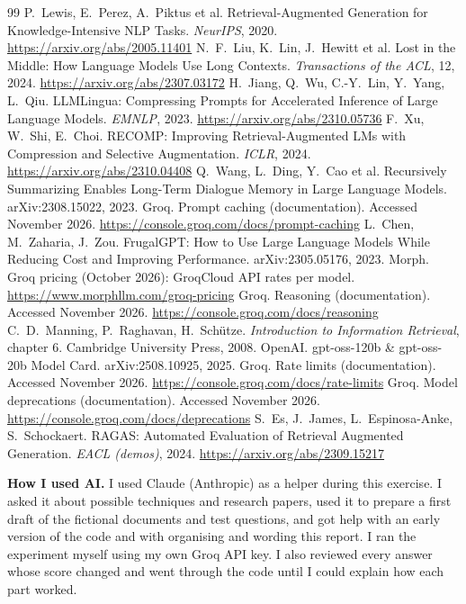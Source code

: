 \documentclass[10pt,a4paper]{article}
\begin{document}
\begin{thebibliography}{99}
\setlength{\itemsep}{0.15em}
 P.~Lewis, E.~Perez, A.~Piktus et al. Retrieval-Augmented Generation for Knowledge-Intensive NLP Tasks. \emph{NeurIPS}, 2020. \url{https://arxiv.org/abs/2005.11401}
 N.~F.~Liu, K.~Lin, J.~Hewitt et al. Lost in the Middle: How Language Models Use Long Contexts. \emph{Transactions of the ACL}, 12, 2024. \url{https://arxiv.org/abs/2307.03172}
 H.~Jiang, Q.~Wu, C.-Y.~Lin, Y.~Yang, L.~Qiu. LLMLingua: Compressing Prompts for Accelerated Inference of Large Language Models. \emph{EMNLP}, 2023. \url{https://arxiv.org/abs/2310.05736}
 F.~Xu, W.~Shi, E.~Choi. RECOMP: Improving Retrieval-Augmented LMs with Compression and Selective Augmentation. \emph{ICLR}, 2024. \url{https://arxiv.org/abs/2310.04408}
 Q.~Wang, L.~Ding, Y.~Cao et al. Recursively Summarizing Enables Long-Term Dialogue Memory in Large Language Models. arXiv:2308.15022, 2023.
 Groq. Prompt caching (documentation). Accessed November 2026. \url{https://console.groq.com/docs/prompt-caching}
 L.~Chen, M.~Zaharia, J.~Zou. FrugalGPT: How to Use Large Language Models While Reducing Cost and Improving Performance. arXiv:2305.05176, 2023.
 Morph. Groq pricing (October 2026): GroqCloud API rates per model. \url{https://www.morphllm.com/groq-pricing}
 Groq. Reasoning (documentation). Accessed November 2026. \url{https://console.groq.com/docs/reasoning}
 C.~D.~Manning, P.~Raghavan, H.~Sch\"utze. \emph{Introduction to Information Retrieval}, chapter 6. Cambridge University Press, 2008.
 OpenAI. gpt-oss-120b \& gpt-oss-20b Model Card. arXiv:2508.10925, 2025.
 Groq. Rate limits (documentation). Accessed November 2026. \url{https://console.groq.com/docs/rate-limits}
 Groq. Model deprecations (documentation). Accessed November 2026. \url{https://console.groq.com/docs/deprecations}
 S.~Es, J.~James, L.~Espinosa-Anke, S.~Schockaert. RAGAS: Automated Evaluation of Retrieval Augmented Generation. \emph{EACL (demos)}, 2024. \url{https://arxiv.org/abs/2309.15217}
\end{thebibliography}
\endgroup

\vspace{0.5em}
\textbf{How I used AI.}
I used Claude (Anthropic) as a helper during this exercise. I asked it about possible techniques and research papers, used it to prepare a first draft of the fictional documents and test questions, and got help with an early version of the code and with organising and wording this report. I ran the experiment myself using my own Groq API key. I also reviewed every answer whose score changed and went through the code until I could explain how each part worked.
\end{document}

